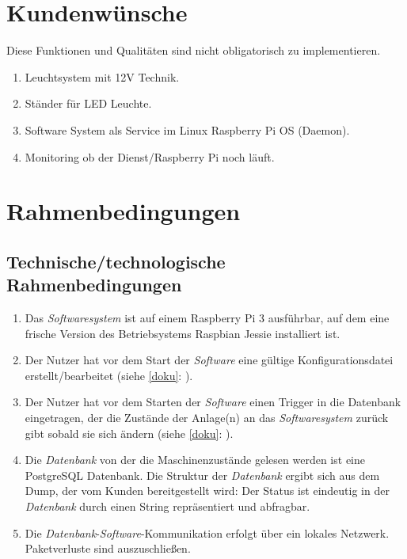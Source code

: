 \documentclass{scrartcl}
\begin{document}
\section{Kundenwünsche}
Diese Funktionen und Qualitäten sind nicht obligatorisch zu implementieren.
\begin{enumerate}[label=/KW\arabic*/]
\item Leuchtsystem mit 12V Technik.
\item Ständer für LED Leuchte.
\item Software System als Service im Linux Raspberry Pi OS (Daemon).
\item Monitoring ob der Dienst/Raspberry Pi noch läuft.
\end{enumerate}

\section{Rahmenbedingungen}
\subsection{Technische/technologische Rahmenbedingungen}
\begin{enumerate}[label=/TR\arabic*/]
\item Das \emph{Softwaresystem} ist auf einem Raspberry Pi 3 ausführbar, auf dem eine frische Version des Betriebsystems Raspbian Jessie installiert ist.
\item Der Nutzer hat vor dem Start der \emph{Software} eine gültige Konfigurationsdatei erstellt/bearbeitet (siehe \ref{doku}: ).
\item Der Nutzer hat vor dem Starten der \emph{Software} einen Trigger in die Datenbank eingetragen, der die Zustände der Anlage(n) an das \emph{Softwaresystem} zurück gibt sobald sie sich ändern (siehe \ref{doku}: ).
\item Die \emph{Datenbank} von der die Maschinenzustände gelesen werden ist eine PostgreSQL Datenbank. Die Struktur der \emph{Datenbank} ergibt sich aus dem Dump, der vom Kunden bereitgestellt wird: Der Status ist eindeutig in der \emph{Datenbank} durch einen String repräsentiert und abfragbar.
\item Die \emph{Datenbank}-\emph{Software}-Kommunikation erfolgt über ein lokales Netzwerk. Paketverluste sind auszuschließen.
\end{enumerate}
\end{document}
